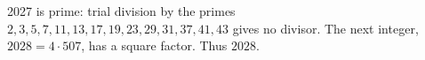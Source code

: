 2027 is prime: trial division by the primes $2,3,5,7,11,13,17,19,23,29,31,37,41,43$ gives no divisor. The next integer, $2028=4\cdot507$, has a square factor. Thus $\boxed{2028}$.
